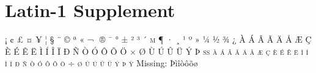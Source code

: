 

\presection\section*{\checkno Latin-1 Supplement}\postsection

\textsc{¡ ¢ £ ¤ ¥ ¦ § ¨ © ª « ¬ ­ ® ¯ ° ± ² ³ ´ µ ¶ · ¸ ¹ º » ¼ ½ ¾ ¿ À Á Â Ã Ä Å Æ Ç È É Ê Ë Ì Í Î Ï Ð Ñ Ò Ó Ô Õ Ö × Ø Ù Ú Û Ü Ý Þ ß à á â ã ä å æ ç è é ê ë ì í î ï ð ñ ò ó ô õ ö ÷ ø ù ú û ü ý þ ÿ}
\hfill Missing: Þìîòôõø 